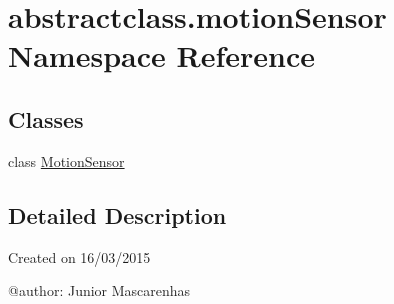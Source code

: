 \hypertarget{namespaceabstractclass_1_1motionSensor}{}\section{abstractclass.\+motion\+Sensor Namespace Reference}
\label{namespaceabstractclass_1_1motionSensor}
\subsection*{Classes}
\begin{DoxyCompactItemize}
\item 
class \hyperlink{classabstractclass_1_1motionSensor_1_1MotionSensor}{Motion\+Sensor}
\end{DoxyCompactItemize}


\subsection{Detailed Description}
\begin{DoxyVerb}Created on 16/03/2015

@author: Junior Mascarenhas
\end{DoxyVerb}
 